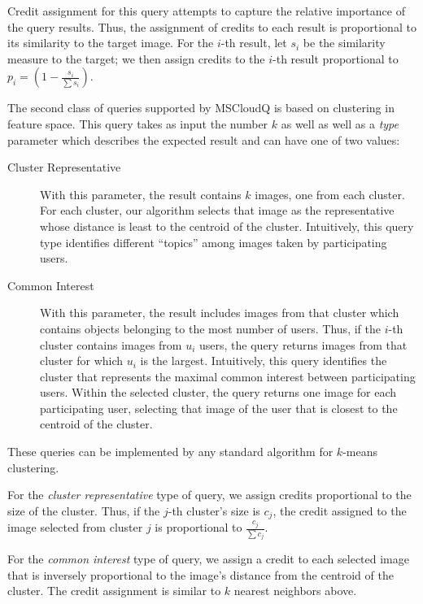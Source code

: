 Credit assignment for this query attempts to capture the relative
importance of the query results.
%
Thus, the assignment of credits to each result is proportional to its
similarity to the target image.
%
For the $i$-th result, let $s_i$ be the similarity measure to the
target; we then assign credits to the $i$-th result proportional to
$p_i = (1 - \frac{s_i}{\sum{s_i}})$.

%
%

%
The second class of queries supported by MSCloudQ is based on
clustering in feature space.
%
This query takes as input the number $k$ as well as well as a
\emph{type} parameter which describes the expected result and can have
one of two values:
\begin{description}
\item[Cluster Representative] With this parameter, the result contains
  $k$ images, one from each cluster. For each cluster, our algorithm
  selects that image as the representative whose distance is least to
  the centroid of the cluster. Intuitively, this query type identifies
  different ``topics'' among images taken by participating users.
\item[Common Interest] With this parameter, the result includes images
  from that cluster which contains objects belonging to the most
  number of users. Thus, if the $i$-th cluster contains images from
  $u_i$ users, the query returns images from that cluster for which
  $u_i$ is the largest. Intuitively, this query identifies the cluster
  that represents the maximal common interest between participating
  users. Within the selected cluster, the query returns one image for
  each participating user, selecting that image of the user that is
  closest to the centroid of the cluster.
\end{description}
%
These queries can be implemented by any standard algorithm for
$k$-means clustering.

For the \emph{cluster representative} type of query, we assign credits
proportional to the size of the cluster.
%
Thus, if the $j$-th cluster's size is $c_j$, the credit assigned to
the image selected from cluster $j$ is proportional to $\frac{c_j}{\sum{c_j}}$.

For the \emph{common interest} type of query, we assign a credit to
each selected image that is inversely proportional to the image's
distance from the centroid of the cluster.
%
The credit assignment is similar to $k$ nearest neighbors above.

